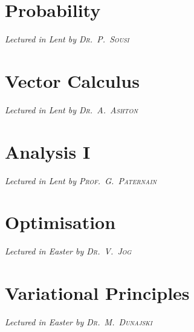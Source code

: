 \newcommand{\volname}{Volume 2}


\chapter[Probability \\ \textnormal{\emph{Lectured in Lent \oldstylenums{2021} by \textsc{Dr.\ P.\ Sousi}}}]{Probability}
\emph{\Large Lectured in Lent  by \textsc{Dr.\ P.\ Sousi}}


\chapter[Vector Calculus \\ \textnormal{\emph{Lectured in Lent \oldstylenums{2021} by \textsc{Dr.\ A.\ Ashton}}}]{Vector Calculus}
\emph{\Large Lectured in Lent  by \textsc{Dr.\ A.\ Ashton}}


\chapter[Analysis I \\ \textnormal{\emph{Lectured in Lent \oldstylenums{2021} by \textsc{Prof.\ G.\ Paternain}}}]{Analysis I}
\emph{\Large Lectured in Lent  by \textsc{Prof.\ G.\ Paternain}}


\chapter[Optimisation \\ \textnormal{\emph{Lectured in Easter \oldstylenums{2021} by \textsc{Dr.\ V.\ Jog}}}]{Optimisation}
\emph{\Large Lectured in Easter  by \textsc{Dr.\ V.\ Jog}}


\chapter[Variational Principles \\ \textnormal{\emph{Lectured in Easter \oldstylenums{2021} by \textsc{Dr.\ M.\ Dunajski}}}]{Variational Principles}
\emph{\Large Lectured in Easter  by \textsc{Dr.\ M.\ Dunajski}}



